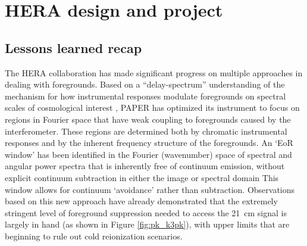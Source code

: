 \documentclass[preprint]{aastex}
\begin{document}
%
%
%
%
%
%
%
%
%
%
%
%
%
%
%
%
%


\section{HERA design and project} %

\subsection{Lessons learned recap} %
The HERA collaboration has made significant progress on multiple approaches in dealing with
foregrounds.
Based on a ``delay-spectrum'' understanding of
the mechanism for how instrumental responses modulate foregrounds on
spectral scales of cosmological interest \citep{parsons_et_al2012b},
PAPER has optimized its instrument to focus on regions in Fourier
space that have weak coupling to foregrounds caused by the
interferometer.  These regions are determined both by chromatic
instrumental responses and by the inherent frequency structure of the
foregrounds.  An `EoR window' has been identified in the Fourier
(wavenumber) space of spectral and angular power spectra that is
inherently free of continuum emission, without explicit continuum
subtraction in either the image or spectral domain \citep{pober_et_al2013,morales_et_al2012,Datta_2010}
This window allows for continuum
`avoidance' rather than subtraction. Observations based on this new
approach have already demonstrated that the extremely stringent level
of foreground suppression needed to access the 21~cm signal is largely
in hand (as shown in Figure \ref{fig:pk_k3pk}), with upper limits
that are beginning to rule out cold reionization scenarios.
\end{document}
